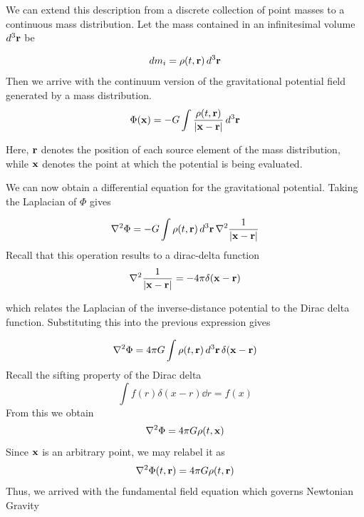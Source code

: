 		We can extend this description from a discrete collection of point masses to a continuous mass distribution.
		Let the mass contained in an infinitesimal volume $\dd[3]{\vb{r}}$ be

		\begin{equation}
			dm_i = \rho(t,\vb{r}) \dd[3]{\vb{r}}
		\end{equation}
		Then we arrive with the continuum version of the gravitational potential field generated by a mass distribution.
		\begin{equation}
			\Phi(\vb{x}) 
			= - G \int \frac{
			\rho(t,\vb{r})}{\abs{\vb{x}-\vb{r}}} 
			\dd[3]{\vb{r}}
		\end{equation}

		Here, $\vb{r}$ denotes the position of each source element of the mass distribution, while $\vb{x}$ denotes the point at which the potential is being evaluated.

		We can now obtain a differential equation for the gravitational potential. Taking the Laplacian of $\Phi$ gives

		\begin{equation}
			\lpc \Phi = -G \int \rho(t,\vb{r})\dd[3]{\vb{r}} \lpc \frac{1}{\abs{\vb{x}-\vb{r}}}
		\end{equation}
		Recall that this operation results to a dirac-delta function
		\begin{equation}
			\lpc \frac{1}{\abs{\vb{x}-\vb{r}}} = - 4\pi\delta(\vb{x}-\vb{r})
		\end{equation}

		which relates the Laplacian of the inverse-distance potential to the Dirac delta function. Substituting this into the previous expression gives

		\begin{equation}
			\lpc \Phi = 4\pi G \int \rho(t,\vb{r})\dd[3]{\vb{r}} \delta(\vb{x}-\vb{r})
		\end{equation}
		Recall the sifting property of the Dirac delta
		\begin{equation}
			\int f(r)\delta(x-r) \dd{r} = f(x)
		\end{equation}
		From this we obtain	
		\begin{equation}
			\lpc \Phi = 4\pi G \rho(t,\vb{x})
		\end{equation}
		Since $\vb{x}$ is an arbitrary point, we may relabel it as 
		\begin{equation}
			\lpc \Phi(t,\vb{r}) = 4\pi G \rho(t,\vb{r})
		\end{equation}
		Thus, we arrived with the fundamental field equation which governs Newtonian Gravity

